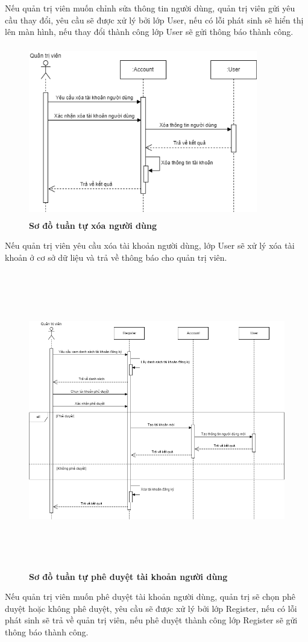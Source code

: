 Nếu quản trị viên muốn chỉnh sửa thông tin người dùng, quản trị viên gửi yêu cầu thay đổi, yêu cầu sẽ được xử lý bởi lớp User, nếu có lỗi phát sinh sẽ hiển thị lên màn hình,
nếu thay đổi thành công lớp User sẽ gửi thông báo thành công. 
\begin{figure}[H]
  \centering
  \includegraphics[width=10cm,height=7.5cm]{Images/sequence/sequence_manage_delete_user.png}
  \caption[Sơ đồ tuần tự xóa người dùng]{\bfseries \fontsize{12pt}{0pt}
  \selectfont Sơ đồ tuần tự xóa người dùng}
  \label{sequence_manage_delete_user} %
\end{figure}
Nếu quản trị viên yêu cầu xóa tài khoản người dùng, lớp User sẽ xử lý xóa tài khoản ở cơ sở dữ liệu và trả về thông báo cho quản trị viên.
\begin{figure}[H]
  \centering
  \includegraphics[width=14.5cm,height=13cm]{Images/sequence/sequence_manage_register.png}
  \caption[Sơ đồ tuần tự phê duyệt tài khoản người dùng]{\bfseries \fontsize{12pt}{0pt}
  \selectfont Sơ đồ tuần tự phê duyệt tài khoản người dùng}
  \label{sequence_manage_register} %
\end{figure}
Nếu quản trị viên muốn phê duyệt tài khoản người dùng, quản trị sẽ chọn phê duyệt hoặc không phê duyệt, yêu cầu sẽ được xử lý bởi lớp Register, nếu có lỗi phát sinh sẽ trả về quản trị viên,
nếu phê duyệt thành công lớp Register sẽ gửi thông báo thành công. 

